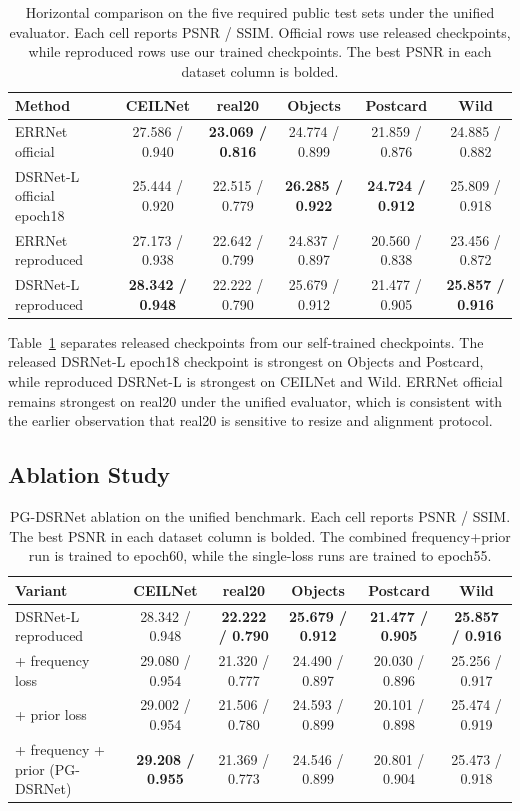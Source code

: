 \documentclass[10pt,twocolumn,letterpaper]{article}
\newcommand{\method}{PG-DSRNet\xspace}
\begin{document}
\begin{table}[t]
\centering
\small
\caption{Horizontal comparison on the five required public test sets under the unified evaluator. Each cell reports PSNR / SSIM. Official rows use released checkpoints, while reproduced rows use our trained checkpoints. The best PSNR in each dataset column is bolded.}
\label{tab:main_results}
\begin{tabular}{lccccc}
\toprule
Method & CEILNet & real20 & Objects & Postcard & Wild \\
\midrule
ERRNet official & 27.586 / 0.940 & \textbf{23.069 / 0.816} & 24.774 / 0.899 & 21.859 / 0.876 & 24.885 / 0.882 \\
DSRNet-L official epoch18 & 25.444 / 0.920 & 22.515 / 0.779 & \textbf{26.285 / 0.922} & \textbf{24.724 / 0.912} & 25.809 / 0.918 \\
ERRNet reproduced & 27.173 / 0.938 & 22.642 / 0.799 & 24.837 / 0.897 & 20.560 / 0.838 & 23.456 / 0.872 \\
DSRNet-L reproduced & \textbf{28.342 / 0.948} & 22.222 / 0.790 & 25.679 / 0.912 & 21.477 / 0.905 & \textbf{25.857 / 0.916} \\
\bottomrule
\end{tabular}
\end{table}

Table~\ref{tab:main_results} separates released checkpoints from our self-trained checkpoints.
The released DSRNet-L epoch18 checkpoint is strongest on Objects and Postcard, while reproduced DSRNet-L is strongest on CEILNet and Wild.
ERRNet official remains strongest on real20 under the unified evaluator, which is consistent with the earlier observation that real20 is sensitive to resize and alignment protocol.

\subsection{Ablation Study}

\begin{table}[t]
\centering
\small
\caption{\method ablation on the unified benchmark. Each cell reports PSNR / SSIM. The best PSNR in each dataset column is bolded. The combined frequency+prior run is trained to epoch60, while the single-loss runs are trained to epoch55.}
\label{tab:ablation}
\begin{tabular}{lccccc}
\toprule
Variant & CEILNet & real20 & Objects & Postcard & Wild \\
\midrule
DSRNet-L reproduced & 28.342 / 0.948 & \textbf{22.222 / 0.790} & \textbf{25.679 / 0.912} & \textbf{21.477 / 0.905} & \textbf{25.857 / 0.916} \\
+ frequency loss & 29.080 / 0.954 & 21.320 / 0.777 & 24.490 / 0.897 & 20.030 / 0.896 & 25.256 / 0.917 \\
+ prior loss & 29.002 / 0.954 & 21.506 / 0.780 & 24.593 / 0.899 & 20.101 / 0.898 & 25.474 / 0.919 \\
+ frequency + prior (\method) & \textbf{29.208 / 0.955} & 21.369 / 0.773 & 24.546 / 0.899 & 20.801 / 0.904 & 25.473 / 0.918 \\
\bottomrule
\end{tabular}
\end{table}
\end{document}
